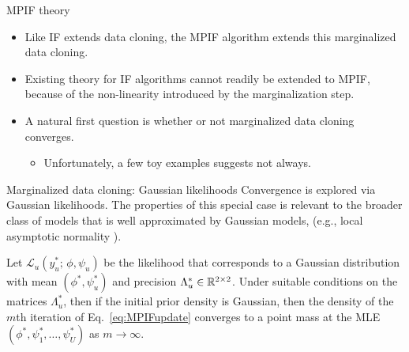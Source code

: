 \documentclass[aspectratio=169]{beamer}\usepackage[]{graphicx}\usepackage[]{xcolor}
\begin{document}
\begin{frame}{MPIF theory}

  \begin{itemize}
    \item Like IF extends data cloning, the MPIF algorithm extends this marginalized data cloning.
    \item Existing theory for IF algorithms cannot readily be extended to MPIF, because of the non-linearity introduced by the marginalization step. 
    \item A natural first question is whether or not marginalized data cloning converges.
    \begin{itemize}
      \item Unfortunately, a few toy examples suggests not always.
    \end{itemize}
  \end{itemize}
  
\end{frame}

\begin{frame}{Marginalized data cloning: Gaussian likelihoods}
  Convergence is explored via Gaussian likelihoods.
  The properties of this special case is relevant to the broader class of models that is well approximated by Gaussian models, (e.g., local asymptotic normality \citep{lecam00}).
  
  \begin{theorem}
    Let $\mathcal{L}_u(y_u^*; \, \phi, \psi_u)$ be the likelihood that corresponds to a Gaussian distribution with mean $(\phi^*, \psi_u^*)$ and precision $\Lambda_u^* \in \mathbb{R}^{2\times2}$. Under suitable conditions on the matrices $\Lambda^*_u$, then if the initial prior density is Gaussian, then the density of the $m$th iteration of Eq.~\ref{eq:MPIFupdate} converges to a point mass at the MLE $(\phi^*, \psi_1^*, \ldots, \psi^*_U)$ as $m\rightarrow \infty$.
  \end{theorem}
\end{frame}
\end{document}
